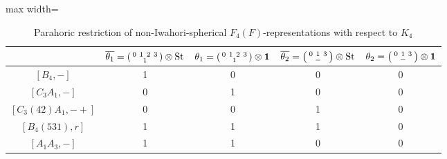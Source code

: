     \begin{table}[ht]
        \centering
        \caption{Parahoric restriction of non-Iwahori-spherical $F_4(F)$-representations with respect to $K_4$}\label{tbl:F4_K4_2}
        \begin{adjustbox}{max width=\linewidth}
        \begin{tabular}{|c|cccc|}
            \hline
            & $\overline{\theta_1}=\begin{psmallmatrix}
            0 \ 1\ 2\ 3\\
            \ \ \ 1\ \ \
        \end{psmallmatrix}\otimes\mathrm{St}$ & $\theta_1=\begin{psmallmatrix}
            0 \ 1\ 2\ 3\\
            \ \ \ 1\ \ \
        \end{psmallmatrix}\otimes\mathbf{1}$ & $\overline{\theta_2}=\begin{psmallmatrix}
            0 \ 1\ 3\\
            \ \ - \ \
        \end{psmallmatrix}\otimes\mathrm{St}$ & $\theta_2=\begin{psmallmatrix}
            0 \ 1\ 3\\
            \ \ - \ \
        \end{psmallmatrix}\otimes\mathbf{1}$ \\\hline
            $[B_4,-]$ & 1 & 0 & 0 & 0 \\\hline
            $[C_3A_1,-]$ & 0 & 1 & 0 & 0 \\\hline
            $[C_3(42)A_1,-+]$ & 0 & 0 & 1 & 0 \\
            $[B_4(531),r]$ & 1 & 1 & 1 & 0 \\
            $[A_1A_3,-]$ & 1 & 1 & 0 & 0 \\\hline            
        \end{tabular}
        \end{adjustbox}
    \end{table}

